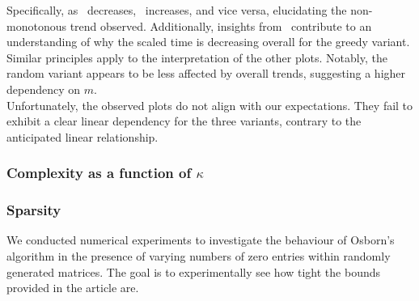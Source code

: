 Specifically, as~ decreases,~ increases, and vice versa, elucidating the non-monotonous trend observed. Additionally, insights from~ contribute to an understanding of why the scaled time is decreasing overall for the greedy variant. Similar principles apply to the interpretation of the other plots. Notably, the random variant appears to be less affected by overall trends, suggesting a higher dependency on \(m\).\\

Unfortunately, the observed plots do not align with our expectations. They fail to exhibit a clear linear dependency for the three variants, contrary to the anticipated linear relationship.

\subsubsection{Complexity as a function of \(\kappa\)}

\subsubsection{Sparsity}

We conducted numerical experiments to investigate the behaviour of Osborn's algorithm in the presence of varying numbers of zero entries within randomly generated matrices. The goal is to experimentally see how tight the bounds provided in the article are.\\


